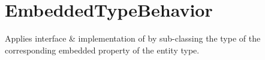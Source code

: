 \section{EmbeddedTypeBehavior}
\label{feature:EmbeddedTypeBehavior}
\ClearAPI
Applies interface \& implementation of  by sub-classing the type of the corresponding embedded property of the entity type.
\TODO